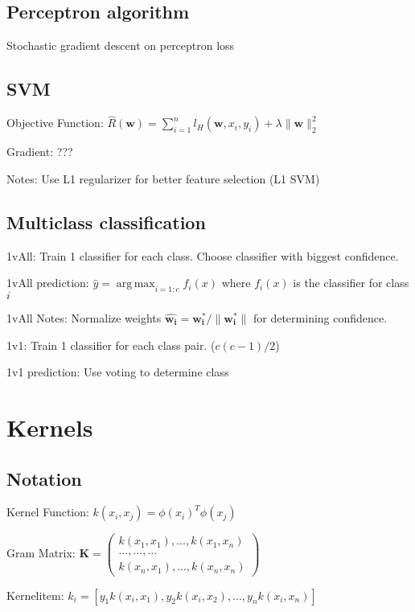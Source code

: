 \documentclass[a4paper, 11pt, landscape]{article}
\DeclareMathOperator*{\argmax}{arg\,max}
\begin{document}
\begin{multicols*}{3}
		\subsection{Perceptron algorithm}
		Stochastic gradient descent on perceptron loss
		\subsection{SVM}
		\begin{compactdesc}
			\item[Objective Function:]  $\hat{R}(\mathbf{w}) = \sum_{i=1}^{n}l_H(\mathbf{w}, x_i, y_i) + \lambda\|\mathbf{w}\|_2^2$
			\item[Gradient:]???
			\item[Notes:] Use L1 regularizer for better feature selection (L1 SVM)
		\end{compactdesc}
		\subsection{Multiclass classification}
		\begin{compactdesc}
			\item[1vAll:] Train 1 classifier for each class. Choose classifier with biggest confidence. 
			\item[1vAll prediction:] $\hat{y} = \argmax_{i=1:c}f_i(x)$ where $f_i(x)$ is the classifier for class $i$
			\item[1vAll Notes:] Normalize weights $\hat{\mathbf{w_i}}=\mathbf{w_i^*}/\|\mathbf{w_i^*}\|$ for determining confidence.
			\item[1v1:] Train 1 classifier for each class pair. ($c(c-1)/2$)
			\item[1v1 prediction:] Use voting to determine class
		\end{compactdesc}

		\section{Kernels}
		\subsection{Notation}
		\begin{compactdesc}
			\item[Kernel Function:] $k(x_i, x_j) = \phi(x_i)^T\phi(x_j)$
			\item[Gram Matrix:] $\mathbf{K} = \left(
				\begin{array}{ccc}
				k(x_1, x_1), ..., k(x_1, x_n)\\
				..., ..., ...\\
				k(x_n, x_1), ..., k(x_n, x_n)
				\end{array}\right)$
			\item[Kernelitem:] $k_i = [y_1k(x_i, x_1), y_2k(x_i, x_2), ..., y_nk(x_i, x_n)]$
		\end{compactdesc}

\end{multicols*}
\end{document}
